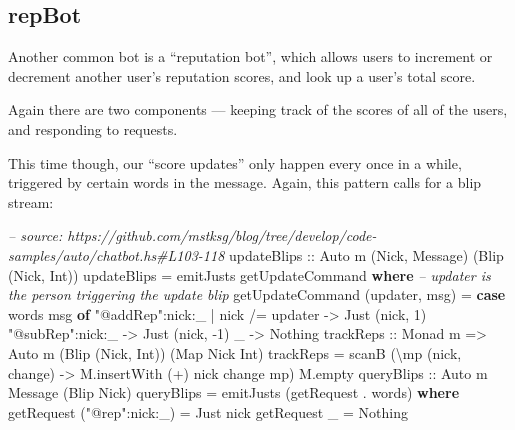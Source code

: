 \documentclass[]{article}
\newenvironment{Shaded}{}{}
\newcommand{\KeywordTok}[1]{\textcolor[rgb]{0.00,0.44,0.13}{\textbf{{#1}}}}
\newcommand{\DataTypeTok}[1]{\textcolor[rgb]{0.56,0.13,0.00}{{#1}}}
\newcommand{\DecValTok}[1]{\textcolor[rgb]{0.25,0.63,0.44}{{#1}}}
\newcommand{\StringTok}[1]{\textcolor[rgb]{0.25,0.44,0.63}{{#1}}}
\newcommand{\CommentTok}[1]{\textcolor[rgb]{0.38,0.63,0.69}{\textit{{#1}}}}
\newcommand{\OtherTok}[1]{\textcolor[rgb]{0.00,0.44,0.13}{{#1}}}
\newcommand{\FunctionTok}[1]{\textcolor[rgb]{0.02,0.16,0.49}{{#1}}}
\newcommand{\NormalTok}[1]{{#1}}
\begin{document}
\subsection{repBot}\label{repbot}

Another common bot is a ``reputation bot'', which allows users to increment or decrement another
user's reputation scores, and look up a user's total score.

Again there are two components --- keeping track of the scores of all of the users, and responding
to requests.

This time though, our ``score updates'' only happen every once in a while, triggered by certain
words in the message. Again, this pattern calls for a blip stream:

\begin{Shaded}
\begin{Highlighting}[]
\CommentTok{-- source: https://github.com/mstksg/blog/tree/develop/code-samples/auto/chatbot.hs#L103-118}
\OtherTok{    updateBlips ::} \DataTypeTok{Auto} \NormalTok{m (}\DataTypeTok{Nick}\NormalTok{, }\DataTypeTok{Message}\NormalTok{) (}\DataTypeTok{Blip} \NormalTok{(}\DataTypeTok{Nick}\NormalTok{, }\DataTypeTok{Int}\NormalTok{))}
    \NormalTok{updateBlips }\FunctionTok{=} \NormalTok{emitJusts getUpdateCommand}
      \KeywordTok{where}
        \CommentTok{-- updater is the person triggering the update blip}
        \NormalTok{getUpdateCommand (updater, msg) }\FunctionTok{=}
          \KeywordTok{case} \NormalTok{words msg }\KeywordTok{of}
            \StringTok{"@addRep"}\FunctionTok{:}\NormalTok{nick}\FunctionTok{:}\NormalTok{_ }\FunctionTok{|} \NormalTok{nick }\FunctionTok{/=} \NormalTok{updater }\OtherTok{->} \DataTypeTok{Just} \NormalTok{(nick, }\DecValTok{1}\NormalTok{)}
            \StringTok{"@subRep"}\FunctionTok{:}\NormalTok{nick}\FunctionTok{:}\NormalTok{_                   }\OtherTok{->} \DataTypeTok{Just} \NormalTok{(nick, }\FunctionTok{-}\DecValTok{1}\NormalTok{)}
            \NormalTok{_                                  }\OtherTok{->} \DataTypeTok{Nothing}
\OtherTok{    trackReps ::} \DataTypeTok{Monad} \NormalTok{m }\OtherTok{=>} \DataTypeTok{Auto} \NormalTok{m (}\DataTypeTok{Blip} \NormalTok{(}\DataTypeTok{Nick}\NormalTok{, }\DataTypeTok{Int}\NormalTok{)) (}\DataTypeTok{Map} \DataTypeTok{Nick} \DataTypeTok{Int}\NormalTok{)}
    \NormalTok{trackReps }\FunctionTok{=} \NormalTok{scanB (\textbackslash{}mp (nick, change) }\OtherTok{->} \NormalTok{M.insertWith (}\FunctionTok{+}\NormalTok{) nick change mp) M.empty}
\OtherTok{    queryBlips ::} \DataTypeTok{Auto} \NormalTok{m }\DataTypeTok{Message} \NormalTok{(}\DataTypeTok{Blip} \DataTypeTok{Nick}\NormalTok{)}
    \NormalTok{queryBlips }\FunctionTok{=} \NormalTok{emitJusts (getRequest }\FunctionTok{.} \NormalTok{words)}
      \KeywordTok{where}
        \NormalTok{getRequest (}\StringTok{"@rep"}\FunctionTok{:}\NormalTok{nick}\FunctionTok{:}\NormalTok{_) }\FunctionTok{=} \DataTypeTok{Just} \NormalTok{nick}
        \NormalTok{getRequest _                }\FunctionTok{=} \DataTypeTok{Nothing}




\end{Highlighting}
\end{Shaded}
\end{document}
